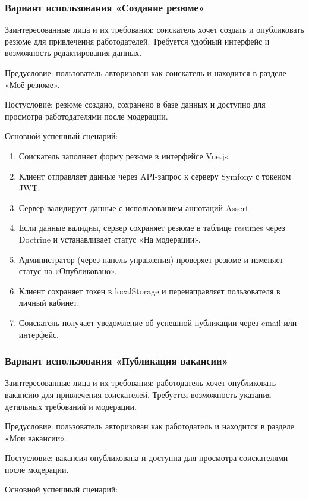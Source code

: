 \subsubsection{Вариант использования «Создание резюме»}
Заинтересованные лица и их требования: соискатель хочет создать и опубликовать резюме для привлечения работодателей. Требуется удобный интерфейс и возможность редактирования данных.

Предусловие: пользователь авторизован как соискатель и находится в разделе «Моё резюме».

Постусловие: резюме создано, сохранено в базе данных и доступно для просмотра работодателями после модерации.

Основной успешный сценарий:

\begin{enumerate}
	\item Соискатель заполняет форму резюме в интерфейсе Vue.js.
	\item Клиент отправляет данные через API-запрос к серверу Symfony с токеном JWT.
	\item Сервер валидирует данные с использованием аннотаций Assert.
	\item Если данные валидны, сервер сохраняет резюме в таблице resumes через Doctrine и устанавливает статус «На модерации».
	\item Администратор (через панель управления) проверяет резюме и изменяет статус на «Опубликовано».
	\item Клиент сохраняет токен в localStorage и перенаправляет пользователя в личный кабинет.
	\item Соискатель получает уведомление об успешной публикации через email или интерфейс.
\end{enumerate}

\subsubsection{Вариант использования «Публикация вакансии»}
Заинтересованные лица и их требования: работодатель хочет опубликовать вакансию для привлечения соискателей. Требуется возможность указания детальных требований и модерации.

Предусловие: пользователь авторизован как работодатель и находится в разделе «Мои вакансии».

Постусловие: вакансия опубликована и доступна для просмотра соискателями после модерации.

Основной успешный сценарий:

